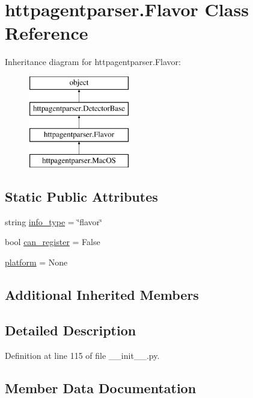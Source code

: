\hypertarget{classhttpagentparser_1_1_flavor}{}\section{httpagentparser.\+Flavor Class Reference}
\label{classhttpagentparser_1_1_flavor}
Inheritance diagram for httpagentparser.\+Flavor\+:\begin{figure}[H]
\begin{center}
\leavevmode
\includegraphics[height=4.000000cm]{classhttpagentparser_1_1_flavor}
\end{center}
\end{figure}
\subsection*{Static Public Attributes}
\begin{DoxyCompactItemize}
\item 
string \hyperlink{classhttpagentparser_1_1_flavor_a689946dcfbf3f0540b547b44fd421f98}{info\+\_\+type} = \char`\"{}flavor\char`\"{}
\item 
bool \hyperlink{classhttpagentparser_1_1_flavor_ae3e7ab6a722b2d7e6f5cd13a795db63f}{can\+\_\+register} = False
\item 
\hyperlink{classhttpagentparser_1_1_flavor_a55fb5da39e53fb9cffd01139f2e56e0b}{platform} = None
\end{DoxyCompactItemize}
\subsection*{Additional Inherited Members}


\subsection{Detailed Description}


Definition at line 115 of file \+\_\+\+\_\+init\+\_\+\+\_\+.\+py.



\subsection{Member Data Documentation}
\hypertarget{classhttpagentparser_1_1_flavor_ae3e7ab6a722b2d7e6f5cd13a795db63f}{}\label{classhttpagentparser_1_1_flavor_ae3e7ab6a722b2d7e6f5cd13a795db63f} 
